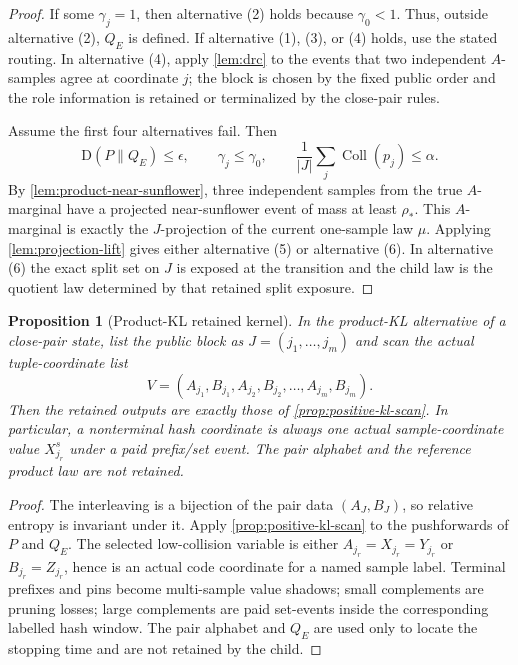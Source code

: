 \documentclass[11pt]{article}
\newcommand{\Cref}[1]{\ref{#1}}
\newtheorem{proposition}[theorem]{Proposition}
\theoremstyle{remark}
\newcommand{\KL}{\mathrm D}
\newcommand{\Coll}{\operatorname{Coll}}
\begin{document}
\begin{proof}
If some $\gamma_j=1$, then alternative (2) holds because $\gamma_0<1$.  Thus, outside alternative (2), $Q_E$ is defined.  If alternative (1), (3), or (4) holds, use the stated routing.  In alternative (4), apply \Cref{lem:drc} to the events that two independent $A$-samples agree at coordinate $j$; the block is chosen by the fixed public order and the role information is retained or terminalized by the close-pair rules.

Assume the first four alternatives fail.  Then
\[
        \KL(P\|Q_E)\le\epsilon,
        \qquad
        \gamma_j\le\gamma_0,
        \qquad
        \frac{1}{|J|}\sum_j\Coll(p_j)\le\alpha.
\]
By \Cref{lem:product-near-sunflower}, three independent samples from the true $A$-marginal have a projected near-sunflower event of mass at least $\rho_*$.  This $A$-marginal is exactly the $J$-projection of the current one-sample law $\mu$.  Applying \Cref{lem:projection-lift} gives either alternative (5) or alternative (6).  In alternative (6) the exact split set on $J$ is exposed at the transition and the child law is the quotient law determined by that retained split exposure.
\end{proof}

\begin{proposition}[Product-KL retained kernel]\label{prop:product-kl}
In the product-KL alternative of a close-pair state, list the public block as $J=(j_1,\ldots,j_m)$ and scan the actual tuple-coordinate list
\[
        V=(A_{j_1},B_{j_1},A_{j_2},B_{j_2},\ldots,A_{j_m},B_{j_m}).
\]
Then the retained outputs are exactly those of \Cref{prop:positive-kl-scan}.  In particular, a nonterminal hash coordinate is always one actual sample-coordinate value $X^s_{j_r}$ under a paid prefix/set event.  The pair alphabet and the reference product law are not retained.
\end{proposition}

\begin{proof}
The interleaving is a bijection of the pair data $(A_J,B_J)$, so relative entropy is invariant under it.  Apply \Cref{prop:positive-kl-scan} to the pushforwards of $P$ and $Q_E$.  The selected low-collision variable is either $A_{j_r}=X_{j_r}=Y_{j_r}$ or $B_{j_r}=Z_{j_r}$, hence is an actual code coordinate for a named sample label.  Terminal prefixes and pins become multi-sample value shadows; small complements are pruning losses; large complements are paid set-events inside the corresponding labelled hash window.  The pair alphabet and $Q_E$ are used only to locate the stopping time and are not retained by the child.
\end{proof}
\end{document}
